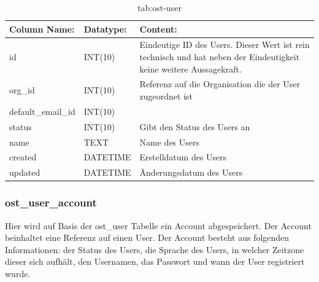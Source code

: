 \begin{table}[h]
	\begin{tabular}{|p{3.5cm}|p{4cm}|p{6.2cm}|}
		\hline
		\textbf{Column Name:} & \textbf{Datatype:} & \textbf{Content:}\\
		\hline
		id & INT(10) & Eindeutige ID des Users. Dieser Wert ist rein technisch und hat  neben der Eindeutigkeit keine weitere 
		Aussagekraft.\\
		\hline
		org\_id & INT(10) & Referenz auf die Organisation die der User zugeordnet ist\\
		\hline
		default\_email\_id& INT(10) & \\
		\hline
		status & INT(10) & Gibt den Status des Users an\\
		\hline
		name & TEXT & Name des Users\\
		\hline
		created & DATETIME & Erstelldatum des Users\\
		\hline
		updated & DATETIME & Änderungsdatum des Users\\
		\hline
		
	\end{tabular}
	\caption{tab:ost-user}
\end{table}
\label{tab:ost_user}

\newpage

\subsubsection{ost\_user\_account}

Hier wird auf Basis der ost\_user Tabelle ein Account abgespeichert. Der Account beinhaltet eine Referenz auf einen User. Der Account besteht aus folgenden Informationen: der Status des Users, die Sprache des Users, in welcher Zeitzone dieser sich aufhält, den Usernamen, das Passwort und wann der User registriert wurde.

